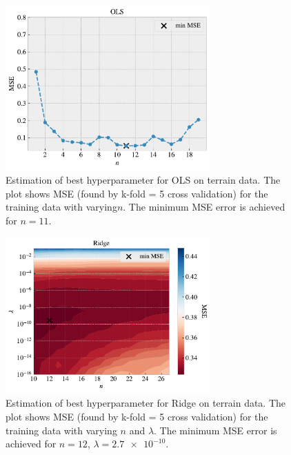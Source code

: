 \documentclass[norsk,a4paper,12pt]{scrartcl}
\begin{document}
\begin{figure}[H]
    \centering
    \includegraphics[width=0.7\textwidth]{figures/real_data_best_OLS_map_BM.pdf}
    \caption{Estimation of best hyperparameter for OLS on terrain data. The plot shows MSE (found by k-fold = 5 cross validation) for the training data with varying$ n$. The minimum MSE error is achieved for $n = 11$. }
    \label{fig:OLS_terrain_hyper}
\end{figure}

\begin{figure}[H]
    \centering
    \includegraphics[width=0.7\textwidth]{figures/real_data_best_Ridge_map_BM.pdf}
    \caption{Estimation of best hyperparameter for Ridge on terrain data. The plot shows MSE (found by k-fold = 5 cross validation) for the training data with varying $n$ and $\lambda$. The minimum MSE error is achieved for $n = 12$, $\lambda = \num{2.7e-10}$.}
    \label{fig:Ridge_terrain_hyper}
\end{figure}
\end{document}
